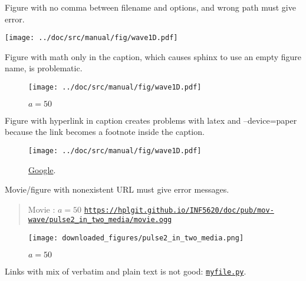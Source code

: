 \documentclass[%
oneside,                 %
final,                   %
10pt]{article}
\newenvironment{doconce:movie}{}{}
\newcounter{doconce:movie:counter}
\begin{document}
Figure with no comma between filename and options, and wrong path must
give error.

\vspace{6mm}

\centerline{\texttt{[image: ../doc/src/manual/fig/wave1D.pdf]}}

\vspace{6mm}

Figure with math only in the caption, which causes sphinx to use an
empty figure name, is problematic.

\begin{figure}[!ht]  %
  \centerline{\texttt{[image: ../doc/src/manual/fig/wave1D.pdf]}}
  \caption{
  $a=50$
  }
\end{figure}

Figure with hyperlink in caption creates problems with latex and --device=paper
because the link becomes a footnote inside the caption.

\begin{figure}[!ht]  %
  \centerline{\texttt{[image: ../doc/src/manual/fig/wave1D.pdf]}}
  \caption{
  \href{{https://google.com}}{Google}.
  }
\end{figure}

Movie/figure with nonexistent URL must give error messages.


\begin{doconce:movie}
\begin{quote}
Movie : $a=50$ \href{https://hplgit.github.io/INF5620/doc/pub/mov-wave/pulse2_in_two_media/movie.ogg}{\nolinkurl{https://hplgit.github.io/INF5620/doc/pub/mov-wave/pulse2_in_two_media/movie.ogg}}
\end{quote}
\end{doconce:movie}


\begin{figure}[!ht]  %
  \centerline{\texttt{[image: downloaded\_figures/pulse2\_in\_two\_media.png]}}
  \caption{
  $a=50$
  }
\end{figure}

Links with mix of verbatim and plain text is not good: \href{{https://some.where.net/myfile.py}}{\nolinkurl{myfile.py}}.
\end{document}
